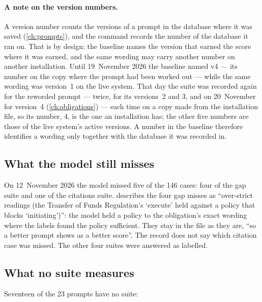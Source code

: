 \paragraph{A note on the version numbers.} A version number counts the versions of a prompt
in the database where it was saved (\cref{ch:prompts}), and the command records the number of
the database it ran on. That is by design: the baseline names the version that earned the
score where it was earned, and the same wording may carry another number on another
installation. Until 19~November 2026 the baseline named  v4 --- its
number on the copy where the prompt had been worked out --- while the same wording was
version~1 on the live system. That day the suite was recorded again for the reworded prompt
--- twice, for its versions~2 and 3, and on 20~November for version~4
(\cref{ch:obligations}) --- each time on a copy made from the installation file, so its
number, 4, is the one an installation has; the other five numbers are those of the live system's active
versions. A number in the baseline therefore identifies a wording only together with the
database it was recorded in.

\subsection{What the model still misses}\label{sec:control:misses}

On 12~November 2026 the model missed five of the 146 cases: four of the gap suite and one of
the citations suite.  describes the four gap misses as
\enquote{over-strict readings (the Transfer of Funds Regulation's \enquote{execute} held
against a policy that blocks \enquote{initiating})}: the model held a policy to the
obligation's exact wording where the labels found the policy sufficient. They stay in the file
as they are, \enquote{so a better prompt shows as a better score}. The record does not say
which citation case was missed. The other four suites were answered as labelled.

\subsection{What no suite measures}\label{sec:control:unmeasured}

Seventeen of the 23 prompts have no suite:

